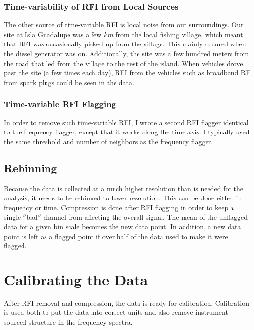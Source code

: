 \subsubsection{Time-variability of RFI from Local Sources}

The other source of time-variable RFI is local noise from our surroundings. Our site at Isla Guadalupe was a few $km$ from the local fishing village, which meant that RFI was occasionally picked up from the village. This mainly occured when the diesel generator was on. Additionally, the site was a few hundred meters from the road that led from the village to the rest of the island. When vehicles drove past the site (a few times each day), RFI from the vehicles such as broadband RF from spark plugs could be seen in the data. 

\subsubsection{Time-variable RFI Flagging}

In order to remove such time-variable RFI, I wrote a second RFI flagger identical to the frequency flagger, except that it works along the time axis. I typically used the same threshold and number of neighbors as the frequency flagger. 


\subsection{Rebinning}

Because the data is collected at a much higher resolution than is needed for the analysis, it needs to be rebinned to lower resolution. This can be done either in frequency or time. Compression is done after RFI flagging in order to keep a single $''$bad$''$ channel from affecting the overall signal. The mean of the unflagged data for a given bin scale becomes the new data point. In addition, a new data point is left as a flagged point if over half of the data used to make it were flagged. 



\section{Calibrating the Data}

After RFI removal and compression, the data is ready for calibration. Calibration is used both to put the data into correct units and also remove instrument sourced structure in the frequency spectra. 


